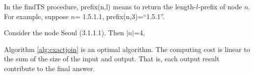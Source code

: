In the findTS procedure, prefix(n,l) means to return the length-$l$-prefix of node $n$. For example, suppose $n$= 1.5.1.1,  prefix(n,3)=``1.5.1''.

\smallskip
\smallskip

\begin{example}
Consider the node Seoul  (3.1.1.1). Then $|n|$=4,
\end{example}

\smallskip
\smallskip


\begin{theorem}  Algorithm \ref{alg:exactjoin} is an optimal algorithm. The computing cost is linear to the sum of the size of the input and output. That is, each output result contribute to the final answer.
\end{theorem}




